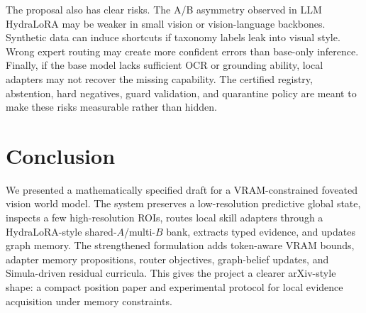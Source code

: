 \documentclass[11pt]{article}
\begin{document}
The proposal also has clear risks.
The A/B asymmetry observed in LLM HydraLoRA may be weaker in small vision or vision-language backbones.
Synthetic data can induce shortcuts if taxonomy labels leak into visual style.
Wrong expert routing may create more confident errors than base-only inference.
Finally, if the base model lacks sufficient OCR or grounding ability, local adapters may not recover the missing capability.
The certified registry, abstention, hard negatives, guard validation, and quarantine policy are meant to make these risks measurable rather than hidden.

\section{Conclusion}

We presented a mathematically specified draft for a VRAM-constrained foveated vision world model.
The system preserves a low-resolution predictive global state, inspects a few high-resolution ROIs, routes local skill adapters through a HydraLoRA-style shared-$A$/multi-$B$ bank, extracts typed evidence, and updates graph memory.
The strengthened formulation adds token-aware VRAM bounds, adapter memory propositions, router objectives, graph-belief updates, and Simula-driven residual curricula.
This gives the project a clearer arXiv-style shape: a compact position paper and experimental protocol for local evidence acquisition under memory constraints.



\end{document}
